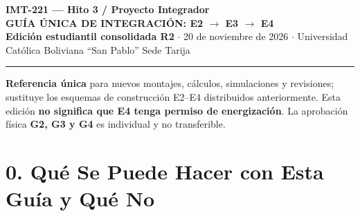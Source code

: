 \documentclass[10pt, a4paper, landscape]{article}
\begin{document}
\noindent
{\LARGE \textbf{\textcolor{ucbblue}{IMT-221 — Hito 3 / Proyecto Integrador}}}\\[0.1cm]
{\Large \textbf{GUÍA ÚNICA DE INTEGRACIÓN: E2 $\rightarrow$ E3 $\rightarrow$ E4}}\\[0.08cm]
{\small \textbf{Edición estudiantil consolidada R2} $\cdot$ 20 de noviembre de 2026 $\cdot$ Universidad Católica Boliviana ``San Pablo'' Sede Tarija}
\par\vspace{0.12cm}\noindent\rule{\linewidth}{0.6pt}\vspace{0.15cm}

\noindent
\textbf{Referencia única} para nuevos montajes, cálculos, simulaciones y revisiones; sustituye los esquemas de construcción E2--E4 distribuidos anteriormente. Esta edición \textbf{\textcolor{warnred}{no significa que E4 tenga permiso de energización}}. La aprobación física \textbf{G2, G3 y G4} es individual y no transferible.

\vspace{0.1cm}
\noindent
{}

\section*{0. Qué Se Puede Hacer con Esta Guía y Qué No}
\end{document}

